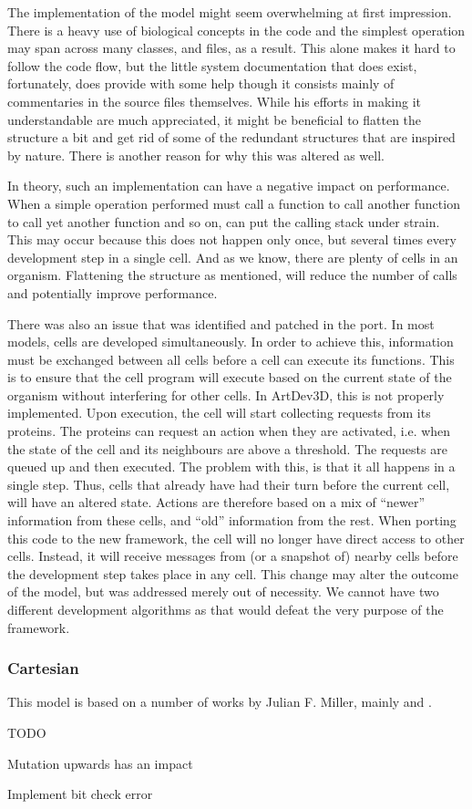 The implementation of the model might seem overwhelming at first impression. There is a heavy use of biological concepts in the code and the simplest operation may span across many classes, and files, as a result. This alone makes it hard to follow the code flow, but the little system documentation that does exist, fortunately, does provide with some help though it consists mainly of commentaries in the source files themselves. While his efforts in making it understandable are much appreciated, it might be beneficial to flatten the structure a bit and get rid of some of the redundant structures that are inspired by nature. There is another reason for why this was altered as well.

In theory, such an implementation can have a negative impact on performance. When a simple operation performed must call a function to call another function to call yet another function and so on, can put the calling stack under strain. This may occur because this does not happen only once, but several times every development step in a single cell. And as we know, there are plenty of cells in an organism. Flattening the structure as mentioned, will reduce the number of calls and potentially improve performance.

There was also an issue that was identified and patched in the port. In most models, cells are developed simultaneously. In order to achieve this, information must be exchanged between all cells before a cell can execute its functions. This is to ensure that the cell program will execute based on the current state of the organism without interfering for other cells. In ArtDev3D, this is not properly implemented. Upon execution, the cell will start collecting requests from its proteins. The proteins can request an action when they are activated, i.e. when the state of the cell and its neighbours are above a threshold. The requests are queued up and then executed. The problem with this, is that it all happens in a single step. Thus, cells that already have had their turn before the current cell, will have an altered state. Actions are therefore based on a mix of ``newer'' information from these cells, and ``old'' information from the rest. When porting this code to the new framework, the cell will no longer have direct access to other cells. Instead, it will receive messages from (or a snapshot of) nearby cells before the development step takes place in any cell. This change may alter the outcome of the model, but was addressed merely out of necessity. We cannot have two different development algorithms as that would defeat the very purpose of the framework.


\subsubsection{Cartesian}
This model is based on a number of works by Julian F. Miller, mainly \cite{mteurogp2000} and \cite{ecal2003}.

TODO

Mutation upwards has an impact

Implement bit check error
